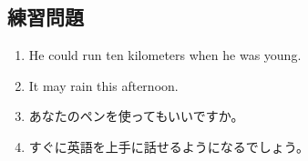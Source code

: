 \subsection{練習問題}
    \begin{enumerate}
        \item He could run ten kilometers when he was young.
        \vspace{0.5em}
        \item It may rain this afternoon.
        \vspace{0.5em}
        \item あなたのペンを使ってもいいですか。
        \vspace{0.5em}
        \item すぐに英語を上手に話せるようになるでしょう。
        \vspace{0.5em}
    \end{enumerate}

\newpage
